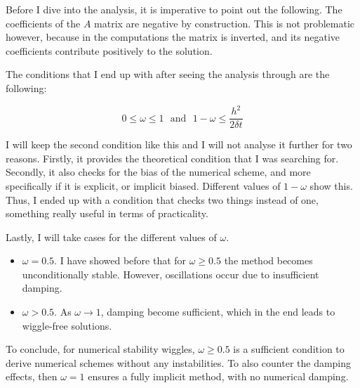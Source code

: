 Before I dive into the analysis, it is imperative to point out the following. The coefficients of the \( A \) matrix are negative by construction. This is not problematic however, because in the computations the matrix is inverted, and its negative coefficients contribute positively to the solution.

The conditions that I end up with after seeing the analysis through are the following:

\[
	0 \leq \omega \leq 1 \,\, \text{ and } \,\, 1-\omega \leq \frac{h^2}{2\delta t}
\]

I will keep the second condition like this and I will not analyse it further for two reasons. Firstly, it provides the theoretical condition that I was searching for. Secondly, it also checks for the bias of the numerical scheme, and more specifically if it is explicit, or implicit biased. Different values of \( 1 - \omega \) show this. Thus, I ended up with a condition that checks two things instead of one, something really useful in terms of practicality. 

Lastly, I will take cases for the different values of \( \omega \).

\begin{itemize}
	\item \( \omega = 0.5 \). I have showed before that for \( \omega \geq 0.5 \) the method becomes unconditionally stable. However, oscillations occur due to insufficient damping.
	\item \( \omega > 0.5 \). As \( \omega \to 1 \), damping become sufficient, which in the end leads to wiggle-free solutions.
\end{itemize}

To conclude, for numerical stability wiggles, \( \omega \geq 0.5 \) is a sufficient condition to derive numerical schemes without any instabilities. To also counter the damping effects, then \( \omega = 1 \) ensures a fully implicit method, with no numerical damping.
